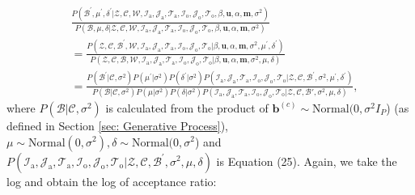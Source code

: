 \documentclass[a4paper]{article}
\begin{document}
 \begin{equation}
 \begin{aligned}
& \frac{P(\mathcal{B}^\prime, \mu^\prime, \delta^\prime|\mathcal{Z},   \mathcal{C},  \mathcal{W}, \mathcal{I}_{\mbox{a}}, \mathcal{J}_{\mbox{a}}, \mathcal{T}_{\mbox{a}}, \mathcal{I}_{\mbox{o}}, \mathcal{J}_{\mbox{o}}, \mathcal{T}_{\mbox{o}}, \beta, \boldsymbol{u}, \alpha, \boldsymbol{m}, \sigma^2)}{P(\mathcal{B}, \mu, \delta|\mathcal{Z},   \mathcal{C},  \mathcal{W}, \mathcal{I}_{\mbox{a}}, \mathcal{J}_{\mbox{a}}, \mathcal{T}_{\mbox{a}}, \mathcal{I}_{\mbox{o}}, \mathcal{J}_{\mbox{o}}, \mathcal{T}_{\mbox{o}}, \beta, \boldsymbol{u}, \alpha, \boldsymbol{m}, \sigma^2)}\\&=\frac{P(\mathcal{Z}, \mathcal{C}, \mathcal{B}^\prime, \mathcal{W}, \mathcal{I}_{\mbox{a}}, \mathcal{J}_{\mbox{a}}, \mathcal{T}_{\mbox{a}},\mathcal{I}_{\mbox{o}}, \mathcal{J}_{\mbox{o}}, \mathcal{T}_{\mbox{o}} |\beta, \boldsymbol{u}, \alpha, \boldsymbol{m}, \sigma^2, \mu^\prime, \delta^\prime)}{P(\mathcal{Z}, \mathcal{C}, \mathcal{B}, \mathcal{W}, \mathcal{I}_{\mbox{a}}, \mathcal{J}_{\mbox{a}}, \mathcal{T}_{\mbox{a}},\mathcal{I}_{\mbox{o}}, \mathcal{J}_{\mbox{o}}, \mathcal{T}_{\mbox{o}} |\beta, \boldsymbol{u}, \alpha, \boldsymbol{m}, \sigma^2, \mu, \delta)}\\&=\frac{P(\mathcal{B}^\prime|\mathcal{C}, \sigma^2)P(\mu^\prime|\sigma^2)P(\delta^\prime|\sigma^2)P(\mathcal{I}_{\mbox{a}}, \mathcal{J}_{\mbox{a}}, \mathcal{T}_{\mbox{a}},\mathcal{I}_{\mbox{o}}, \mathcal{J}_{\mbox{o}}, \mathcal{T}_{\mbox{o}} |\mathcal{Z}, \mathcal{C}, \mathcal{B}^\prime, \sigma^2, \mu^\prime, \delta^\prime)}{P(\mathcal{B}|\mathcal{C}, \sigma^2)P(\mu|\sigma^2)P(\delta|\sigma^2)P(\mathcal{I}_{\mbox{a}}, \mathcal{J}_{\mbox{a}}, \mathcal{T}_{\mbox{a}},\mathcal{I}_{\mbox{o}}, \mathcal{J}_{\mbox{o}}, \mathcal{T}_{\mbox{o}} |\mathcal{Z}, \mathcal{C}, \mathcal{B}\prime, \sigma^2, \mu, \delta)},
 \end{aligned}
 \end{equation}
 where $P(\mathcal{B}|\mathcal{C}, \sigma^2)$ is calculated from the product of $\boldsymbol{b}^{(c)}\sim \mbox{Normal}(0, \sigma^2 I_P$) (as defined in Section \ref{sec: Generative Process}), $\mu \sim \mbox{Normal}(0, \sigma^2), \delta \sim \mbox{Normal}(0, \sigma^2$) and $P(\mathcal{I}_{\mbox{a}}, \mathcal{J}_{\mbox{a}}, \mathcal{T}_{\mbox{a}},\mathcal{I}_{\mbox{o}}, \mathcal{J}_{\mbox{o}}, \mathcal{T}_{\mbox{o}} |\mathcal{Z}, \mathcal{C}, \mathcal{B}^\prime, \sigma^2, \mu, \delta)$ is Equation (25). Again, we take the log and obtain the log of acceptance ratio:
\end{document}
